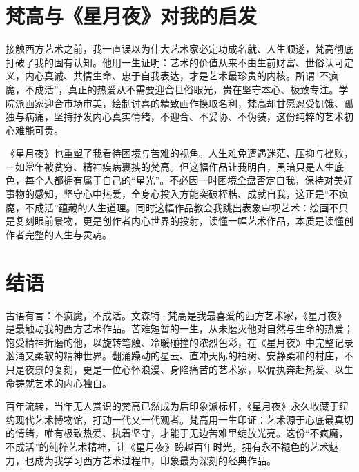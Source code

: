 \documentclass[12pt,a4paper]{article}
\begin{document}
\section{梵高与《星月夜》对我的启发}
接触西方艺术之前，我一直误以为伟大艺术家必定功成名就、人生顺遂，梵高彻底打破了我的固有认知。他用一生证明：艺术的价值从来不由生前财富、世俗认可定义，内心真诚、共情生命、忠于自我表达，才是艺术最珍贵的内核。所谓“不疯魔，不成活”，真正的热爱从不需要迎合世俗眼光，贵在坚守本心、极致专注。学院派画家迎合市场审美，绘制讨喜的精致画作换取名利，梵高却甘愿忍受饥饿、孤独与病痛，坚持抒发内心真实情绪，不迎合、不妥协、不伪装，这份纯粹的艺术初心难能可贵。

《星月夜》也重塑了我看待困境与苦难的视角。人生难免遭遇迷茫、压抑与挫败，一如常年被贫穷、精神疾病裹挟的梵高。但这幅作品让我明白，黑暗只是人生底色，每个人都拥有属于自己的“星光”。不必因一时困境全盘否定自我，保持对美好事物的感知，坚守心中热爱，全身心投入方能突破桎梏、成就自我，这正是“不疯魔，不成活”蕴藏的人生道理。同时这幅作品教会我跳出表象审视艺术：绘画不只是复刻眼前景物，更是创作者内心世界的投射，读懂一幅艺术作品，本质是读懂创作者完整的人生与灵魂。

\section{结语}
古语有言：不疯魔，不成活。文森特·梵高是我最喜爱的西方艺术家，《星月夜》是最触动我的西方艺术作品。苦难短暂的一生，从未磨灭他对自然与生命的热爱；饱受精神折磨的他，以旋转笔触、冷暖碰撞的浓烈色彩，在《星月夜》中完整记录汹涌又柔软的精神世界。翻涌躁动的星云、直冲天际的柏树、安静柔和的村庄，不只是夜景的复刻，更是一位心怀浪漫、身陷痛苦的艺术家，以偏执奔赴热爱、以生命铸就艺术的内心独白。

百年流转，当年无人赏识的梵高已然成为后印象派标杆，《星月夜》永久收藏于纽约现代艺术博物馆，打动一代又一代观者。梵高用一生印证：艺术源于心底最真切的情绪，唯有极致热爱、执着坚守，才能于无边苦难里绽放光亮。这份“不疯魔，不成活”的纯粹艺术精神，让《星月夜》跨越百年时光，拥有永不褪色的艺术魅力，也成为我学习西方艺术过程中，印象最为深刻的经典作品。
\end{document}
